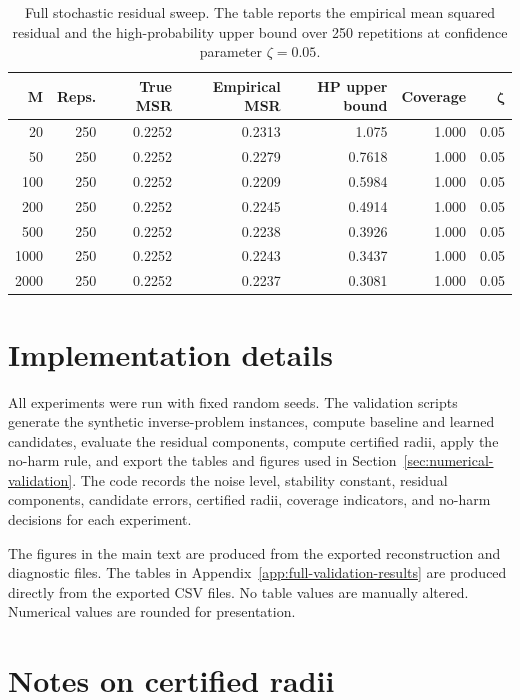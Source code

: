 \documentclass{article}
\numberwithin{equation}{section}
\theoremstyle{definition}
\begin{document}
\begin{table}[!ht]
\centering
\caption{Full stochastic residual sweep. The table reports the empirical mean squared residual and the high-probability upper bound over 250 repetitions at confidence parameter \(\zeta=0.05\).}
\label{tab:appendix-stochastic-sweep}
\begin{tabular}{rrrrrrr}
	\toprule
	\(\boldsymbol{M}\) & \textbf{Reps.} & \textbf{True MSR} & \textbf{Empirical MSR} & \textbf{HP upper bound} & \textbf{Coverage} & \(\boldsymbol{\zeta}\) \\
	\midrule
	20 & 250 & 0.2252 & 0.2313 & 1.075 & 1.000 & 0.05 \\
	50 & 250 & 0.2252 & 0.2279 & 0.7618 & 1.000 & 0.05 \\
	100 & 250 & 0.2252 & 0.2209 & 0.5984 & 1.000 & 0.05 \\
	200 & 250 & 0.2252 & 0.2245 & 0.4914 & 1.000 & 0.05 \\
	500 & 250 & 0.2252 & 0.2238 & 0.3926 & 1.000 & 0.05 \\
	1000 & 250 & 0.2252 & 0.2243 & 0.3437 & 1.000 & 0.05 \\
	2000 & 250 & 0.2252 & 0.2237 & 0.3081 & 1.000 & 0.05 \\
	\bottomrule
\end{tabular}
\end{table}

\section{Implementation details}
\label{app:implementation-details}

All experiments were run with fixed random seeds. The validation scripts generate the synthetic inverse-problem instances, compute baseline and learned candidates, evaluate the residual components, compute certified radii, apply the no-harm rule, and export the tables and figures used in Section~\ref{sec:numerical-validation}. The code records the noise level, stability constant, residual components, candidate errors, certified radii, coverage indicators, and no-harm decisions for each experiment.

The figures in the main text are produced from the exported reconstruction and diagnostic files. The tables in Appendix~\ref{app:full-validation-results} are produced directly from the exported CSV files. No table values are manually altered. Numerical values are rounded for presentation.

\section{Notes on certified radii}
\label{app:certified-radius-notes}
\end{document}

